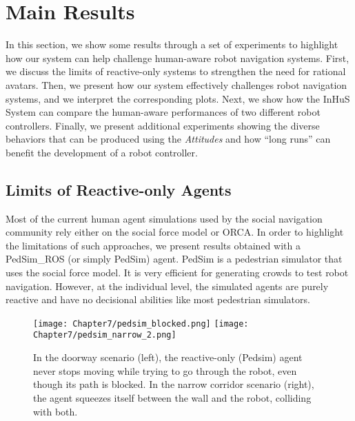 \clearpage

\section{Main Results}

In this section, we show some results through a set of experiments to highlight how our system can help challenge human-aware robot navigation systems. First, we discuss the limits of reactive-only systems to strengthen the need for rational avatars. 
Then, we present how our system effectively challenges robot navigation systems, and we interpret the corresponding plots.
Next, we show how the InHuS System can compare the human-aware performances of two different robot controllers.
Finally, we present additional experiments showing the diverse behaviors that can be produced using the \textit{Attitudes} and how ``long runs'' can benefit the development of a robot controller.

\subsection{Limits of Reactive-only Agents}
\label{sec:pedsim_compare}
Most of the current human agent simulations used by the social navigation community rely either on the social force model or ORCA. In order to highlight the limitations of such approaches, we present results obtained with a PedSim\_ROS (or simply PedSim) agent. PedSim is a pedestrian simulator that uses the social force model. It is very efficient for generating crowds to test robot navigation. However, at the individual level, the simulated agents are purely reactive and have no decisional abilities like most pedestrian simulators. 

\begin{figure}[h]
    \centering
    \texttt{[image: Chapter7/pedsim\_blocked.png]}
    \texttt{[image: Chapter7/pedsim\_narrow\_2.png]}
    \caption{
    In the doorway scenario (left), the reactive-only (Pedsim) agent never stops moving while trying to go through the robot, even though its path is blocked. 
    In the narrow corridor scenario (right), the agent squeezes itself between the wall and the robot, colliding with both. 
    }
    \label{fig:limits_reactive}
\end{figure}

